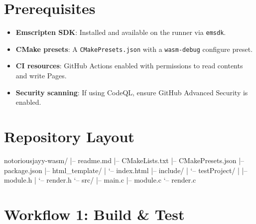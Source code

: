 \documentclass[11pt]{article}
\begin{document}
\section{Prerequisites}

\begin{itemize}
  \item \textbf{Emscripten SDK}: Installed and available on the runner via \texttt{emsdk}.
  \item \textbf{CMake presets}: A \texttt{CMakePresets.json} with a \texttt{wasm-debug} configure preset.
  \item \textbf{CI resources}: GitHub Actions enabled with permissions to read contents and write Pages.
  \item \textbf{Security scanning}: If using CodeQL, ensure GitHub Advanced Security is enabled.
\end{itemize}

\section{Repository Layout}

\begin{textcode}
notoriousjayy-wasm/
|-- readme.md
|-- CMakeLists.txt
|-- CMakePresets.json
|-- package.json
|-- html_template/
|   `-- index.html
|-- include/
|   `-- testProject/
|       |-- module.h
|       `-- render.h
`-- src/
    |-- main.c
    |-- module.c
    `-- render.c
\end{textcode}

\section{Workflow 1: Build \& Test}
\end{document}
